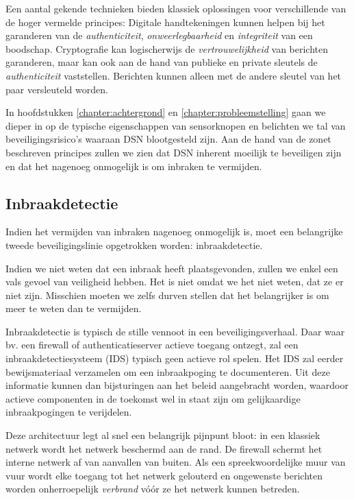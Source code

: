 Een aantal gekende technieken bieden klassiek oplossingen voor verschillende
van de hoger vermelde principes: Digitale handtekeningen kunnen helpen bij het
garanderen van de \emph{authenticiteit}, \emph{onweerlegbaarheid} en
\emph{integriteit} van een boodschap. Cryptografie kan logischerwijs de
\emph{vertrouwelijkheid} van berichten garanderen, maar kan ook aan de hand van
publieke en private sleutels de \emph{authenticiteit} vaststellen. Berichten
kunnen alleen met de andere sleutel van het paar versleuteld worden.

In hoofdstukken \ref{chapter:achtergrond} en \ref{chapter:probleemstelling}
gaan we dieper in op de typische eigenschappen van sensorknopen en belichten we
tal van beveiligingsrisico's waaraan DSN blootgesteld zijn. Aan de hand van de
zonet beschreven principes zullen we zien dat DSN inherent moeilijk te
beveiligen zijn en dat het nagenoeg onmogelijk is om inbraken te vermijden.

\subsection{Inbraakdetectie}
\label{subsection:detection}

Indien het vermijden van inbraken nagenoeg onmogelijk is, moet een belangrijke
tweede beveiligingslinie opgetrokken worden: inbraakdetectie.

Indien we niet weten dat een inbraak heeft plaatsgevonden, zullen we enkel een
vals gevoel van veiligheid hebben. Het is niet omdat we het niet weten, dat ze
er niet zijn. Misschien moeten we zelfs durven stellen dat het belangrijker is
om meer te weten dan te vermijden.

Inbraakdetectie is typisch de stille vennoot in een beveiligingsverhaal. Daar
waar bv. een firewall of authenticatieserver actieve toegang ontzegt, zal een
inbraakdetectiesysteem (IDS) typisch geen actieve rol spelen. Het IDS zal
eerder bewijsmateriaal verzamelen om een inbraakpoging te documenteren. Uit
deze informatie kunnen dan bijsturingen aan het beleid aangebracht worden,
waardoor actieve componenten in de toekomst wel in staat zijn om gelijkaardige
inbraakpogingen te verijdelen.

Deze architectuur legt al snel een belangrijk pijnpunt bloot: in een klassiek
netwerk wordt het netwerk beschermd aan de rand. De firewall schermt het
interne netwerk af van aanvallen van buiten. Als een spreekwoordelijke muur van
vuur wordt elke toegang tot het netwerk gelouterd en ongewenste berichten
worden onherroepelijk \emph{verbrand} v\'o\'or ze het netwerk kunnen betreden.

